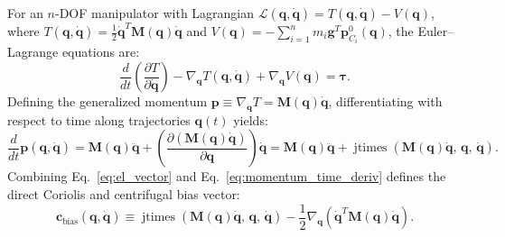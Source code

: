 \documentclass[fleqn,10pt]{article}
\begin{document}
	For an $n$-DOF manipulator with Lagrangian $\mathcal{L}(\bm{q}, \dot{\bm{q}}) = T(\bm{q}, \dot{\bm{q}}) - V(\bm{q})$, where $T(\bm{q}, \dot{\bm{q}}) = \frac{1}{2}\dot{\bm{q}}^T\bm{M}(\bm{q})\dot{\bm{q}}$ and $V(\bm{q}) = -\sum_{i=1}^n m_i \bm{g}^T \bm{p}_{C_i}^0(\bm{q})$, the Euler--Lagrange equations are:
	\begin{equation}
		\frac{d}{dt}\left(\frac{\partial T}{\partial \dot{\bm{q}}}\right) - \nabla_{\bm{q}} T(\bm{q}, \dot{\bm{q}}) + \nabla_{\bm{q}} V(\bm{q}) = \bm{\tau}.
		\label{eq:el_vector}
	\end{equation}
	Defining the generalized momentum $\bm{p} \equiv \nabla_{\dot{\bm{q}}} T = \bm{M}(\bm{q})\dot{\bm{q}}$, differentiating with respect to time along trajectories $\bm{q}(t)$ yields:
	\begin{equation}
		\frac{d}{dt}\bm{p}(\bm{q}, \dot{\bm{q}}) = \bm{M}(\bm{q})\ddot{\bm{q}} + \left(\frac{\partial (\bm{M}(\bm{q})\dot{\bm{q}})}{\partial \bm{q}}\right)\dot{\bm{q}} = \bm{M}(\bm{q})\ddot{\bm{q}} + \operatorname{jtimes}\!\left(\bm{M}(\bm{q})\dot{\bm{q}},\, \bm{q},\, \dot{\bm{q}}\right).
		\label{eq:momentum_time_deriv}
	\end{equation}
	Combining Eq.~\eqref{eq:el_vector} and Eq.~\eqref{eq:momentum_time_deriv} defines the direct Coriolis and centrifugal bias vector:
	\begin{equation}
		\mathbf{c}_{\text{bias}}(\bm{q}, \dot{\bm{q}}) \equiv \operatorname{jtimes}\!\left(\bm{M}(\bm{q})\dot{\bm{q}},\, \bm{q},\, \dot{\bm{q}}\right) - \frac{1}{2}\nabla_{\bm{q}}\!\left(\dot{\bm{q}}^T \bm{M}(\bm{q})\dot{\bm{q}}\right).
		\label{eq:cbias_exact}
	\end{equation}
	
\end{document}
